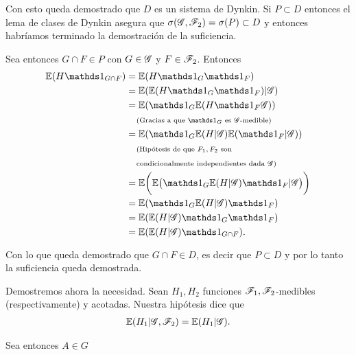 Con esto queda demostrado que $D$ es un sistema de Dynkin. Si $P \subset D$ entonces el lema de clases de Dynkin asegura que
$\sigma(\mathscr{G}, \mathscr{F}_2) = \sigma(P) \subset D$ y entonces habríamos terminado la demostración de la suficiencia.\pn

Sea entonces $G \cap F \in P$ con $G \in \mathscr{G}$ y $F \in \mathscr{F}_2$. Entonces
\begin{align}
        \E(H \indic_{G \cap F})     &=  \E(H \indic_G \indic_F)                                     \\
                                    &=  \E(\E(H \indic_G \indic_F) | \G)                            \\
                                    &=  \E(\indic_G \E(H \indic_F \G))                              \\
                                    &\comment{Gracias a que $\indic_G$ es $\G$-medible}             \\
                                    &=  \E(\indic_G \E(H | \G) \E(\indic_F | \G))                   \\
                                    &\lcomment{Hipótesis de que $F_1, F_2$ son}                     \\
                                    &\rcomment{condicionalmente independientes dada $\G$}           \\
                                    &=  \E\bigg(\E\big(\indic_G \E(H | \G) \indic_F | \G\big)\bigg) \\
                                    &=  \E(\indic_G \E(H | \G) \indic_F)                            \\
                                    &=  \E(\E(H | \G) \indic_G \indic_F)                            \\
                                    &=  \E(\E(H | \G) \indic_{G \cap F}).
\end{align}

Con lo que queda demostrado que $G \cap F \in D$, es decir que $P \subset D$ y por lo tanto la suficiencia queda demostrada.\pn

Demostremos ahora la necesidad. Sean $H_1, H_2$ funciones $\mathscr{F}_1, \mathscr{F}_2$-medibles (respectivamente) y acotadas. Nuestra hipótesis dice que
\begin{align}
    \mathbb{E}(H_1 | \mathscr{G}, \mathscr{F}_2) = \mathbb{E}(H_1 | \mathscr{G}) \label{problema4_1:hipotesis_necesidad_4_1_2}.   
\end{align}\pn

Sea entonces $A \in G$

